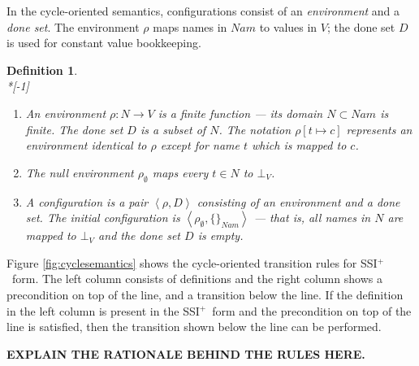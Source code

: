 \documentclass[12pt,notitlepage,twoside]{article}
\newtheorem{definition}{Definition}
\newcommand{\tuple}[1]{\ensuremath{\left\langle #1 \right\rangle}}
\newcommand{\ssiplus}{SSI$^+$}
\begin{document}
In the cycle-oriented semantics, configurations consist of an
\emph{environment} and a \emph{done set}.  The environment $\rho$ maps
names in $\mathit{Nam}$ to values in $V$; the done set $D$ is used for constant
value bookkeeping.

\begin{definition}~\\*[-1\baselineskip]
\begin{enumerate}
\item An \emph{environment} $\rho: N \to V$ is a finite function ---
its domain $N \subset \mathit{Nam}$ is finite.  The \emph{done set}
$D$ is a subset of $N$.
The notation $\rho[t\mapsto c]$ represents an environment
identical to $\rho$ except for name $t$ which is mapped to $c$.
\item The null environment $\rho_\emptyset$ maps every $t\in N$ to
$\bot_V$.
\item A \emph{configuration} is a pair $\tuple{\rho,D}$ consisting of
an environment and a done set.  The initial configuration is
$\tuple{\rho_\emptyset, \{\}_{\mathit{Nam}}}$ ---
that is, all names in $N$ are
mapped to $\bot_V$ and the done set $D$ is empty.
\end{enumerate}
\end{definition}

Figure \ref{fig:cyclesemantics} shows the cycle-oriented transition
rules for \ssiplus\ form.  The left column consists of definitions and
the right column shows a precondition on top of the line, and a
transition below the line.  If the definition in the left column is
present in the \ssiplus\ form and the precondition on top of the line
is satisfied, then the transition shown below the line can be performed.

\textbf{EXPLAIN THE RATIONALE BEHIND THE RULES HERE.}
\end{document}
